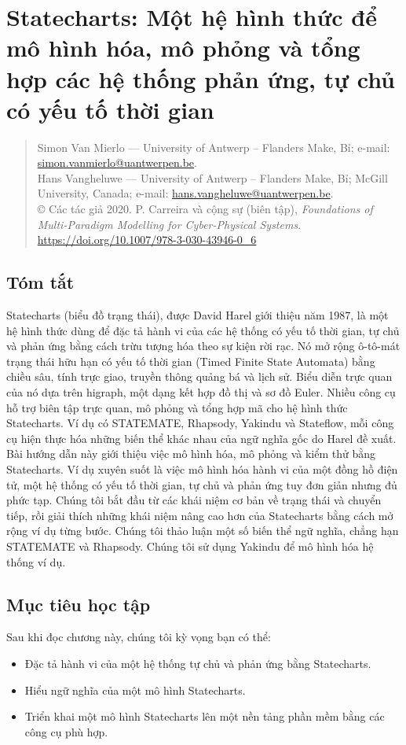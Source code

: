 \chapter{Statecharts: Một hệ hình thức để mô hình hóa, mô phỏng và tổng hợp các hệ thống phản ứng, tự chủ có yếu tố thời gian}

\begin{quote}\small
Simon Van Mierlo --- University of Antwerp -- Flanders Make, Bỉ; e-mail: \url{simon.vanmierlo@uantwerpen.be}.\\
Hans Vangheluwe --- University of Antwerp -- Flanders Make, Bỉ; McGill University, Canada; e-mail: \url{hans.vangheluwe@uantwerpen.be}.\\
© Các tác giả 2020. P. Carreira và cộng sự (biên tập), \emph{Foundations of Multi-Paradigm Modelling for Cyber-Physical Systems}.\\
\url{https://doi.org/10.1007/978-3-030-43946-0_6}
\end{quote}

\section*{Tóm tắt}
Statecharts (biểu đồ trạng thái), được David Harel giới thiệu năm 1987, là một hệ hình thức dùng để đặc tả hành vi của các hệ thống có yếu tố thời gian, tự chủ và phản ứng bằng cách trừu tượng hóa theo sự kiện rời rạc. Nó mở rộng ô-tô-mát trạng thái hữu hạn có yếu tố thời gian (Timed Finite State Automata) bằng chiều sâu, tính trực giao, truyền thông quảng bá và lịch sử. Biểu diễn trực quan của nó dựa trên higraph, một dạng kết hợp đồ thị và sơ đồ Euler. Nhiều công cụ hỗ trợ biên tập trực quan, mô phỏng và tổng hợp mã cho hệ hình thức Statecharts. Ví dụ có STATEMATE, Rhapsody, Yakindu và Stateflow, mỗi công cụ hiện thực hóa những biến thể khác nhau của ngữ nghĩa gốc do Harel đề xuất. Bài hướng dẫn này giới thiệu việc mô hình hóa, mô phỏng và kiểm thử bằng Statecharts. Ví dụ xuyên suốt là việc mô hình hóa hành vi của một đồng hồ điện tử, một hệ thống có yếu tố thời gian, tự chủ và phản ứng tuy đơn giản nhưng đủ phức tạp. Chúng tôi bắt đầu từ các khái niệm cơ bản về trạng thái và chuyển tiếp, rồi giải thích những khái niệm nâng cao hơn của Statecharts bằng cách mở rộng ví dụ từng bước. Chúng tôi thảo luận một số biến thể ngữ nghĩa, chẳng hạn STATEMATE và Rhapsody. Chúng tôi sử dụng Yakindu để mô hình hóa hệ thống ví dụ.

\section*{Mục tiêu học tập}
Sau khi đọc chương này, chúng tôi kỳ vọng bạn có thể:
\begin{itemize}
\item Đặc tả hành vi của một hệ thống tự chủ và phản ứng bằng Statecharts.
\item Hiểu ngữ nghĩa của một mô hình Statecharts.
\item Triển khai một mô hình Statecharts lên một nền tảng phần mềm bằng các công cụ phù hợp.
\end{itemize}

